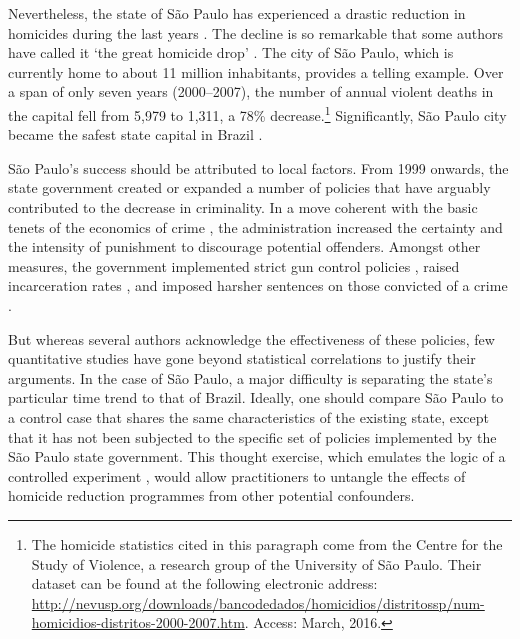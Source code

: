 Nevertheless, the state of São Paulo has experienced a drastic reduction in homicides during the last years \citep{camargo2007}. The decline is so remarkable that some authors have called it `the great homicide drop' \citep{goertzel2009}. The city of São Paulo, which is currently home to about 11 million inhabitants, provides a telling example. Over a span of only seven years (2000--2007), the number of annual violent deaths in the capital fell from 5,979 to 1,311, a 78\% decrease.\footnote{The homicide statistics cited in this paragraph come from the Centre for the Study of Violence, a research group of the University of São Paulo. Their dataset can be found at the following electronic address: \url{http://nevusp.org/downloads/bancodedados/homicidios/distritossp/num-homicidios-distritos-2000-2007.htm}. Access: March, 2016.} Significantly, São Paulo city became the safest state capital in Brazil \citep{mapa2011}.

São Paulo's success should be attributed to local factors. From 1999 onwards, the state government created or expanded a number of policies that have arguably contributed to the decrease in criminality. In a move coherent with the basic tenets of the economics of crime \citep[e.g.][]{becker1968crime, cornish2014reasoning}, the administration increased the certainty and the intensity of punishment to discourage potential offenders. Amongst other measures, the government implemented strict gun control policies \citep{goertzel2009}, raised incarceration rates \citep{salla2007}, and imposed harsher sentences on those convicted of a crime \citep{carvalho2005}. 

But whereas several authors acknowledge the effectiveness of these policies, few quantitative studies have gone beyond statistical correlations to justify their arguments. In the case of São Paulo, a major difficulty is separating the state's particular time trend to that of Brazil. Ideally, one should compare São Paulo to a control case that shares the same characteristics of the existing state, except that it has not been subjected to the specific set of policies implemented by the São Paulo state government. This thought exercise, which emulates the logic of a controlled experiment \citep{angrist2008mostly, imbens2015causal, holland1986, morgan2014counterfactuals}, would allow practitioners to untangle the effects of homicide reduction programmes from other potential confounders. 

